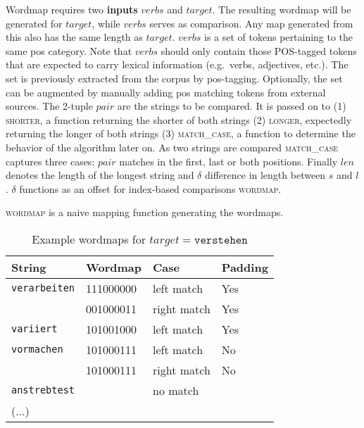 Wordmap requires two \textbf{inputs} $verbs$ and $target$.
The resulting wordmap will be generated for $target$, while $verbs$ serves as comparison.
Any map generated from this also has the same length as $target$.
$verbs$ is a set of tokens pertaining to the same \ac{pos} category.
Note that $verbs$ should only contain those POS-tagged tokens that are expected to carry lexical information (e.g.\ verbs, adjectives, etc.).
The set is previously extracted from the corpus by \ac{pos}\hyphen tagging.
Optionally, the set can be augmented by manually adding \ac{pos} matching tokens from external sources.
The 2-tuple $pair$ are the strings to be compared.
It is passed on to (1) \textsc{shorter}, a function returning the shorter of both strings (2) \textsc{longer}, expectedly returning the longer of both strings (3) \textsc{match\_case}, a function to determine the behavior of the algorithm later on.
As two strings are compared \textsc{match\_case} captures three cases: $pair$ matches in the first, last or both positions.
Finally $len$ denotes the length of the longest string and $\delta$ difference in length between $s$ and $l$.
$\delta$ functions as an offset for index-based comparisons \textsc{wordmap}.

\textsc{wordmap} is a naive mapping function generating the wordmaps.


\begin{table}
    \centering
    \begin{tabular}{llll}
        \toprule
        \textbf{String} & \textbf{Wordmap} & \textbf{Case} & \textbf{Padding} \\
        \midrule
        \texttt{verarbeiten} & 111000000 & left match & Yes \\
         & 001000011 & right match & Yes \\
        \texttt{variiert} & 101001000 & left match & Yes \\
        \texttt{vormachen} & 101000111 & left match & No \\
        & 101000111 & right match & No \\
        \texttt{anstrebtest} &  & no match &   \\
        (...) &  &  &  \\
        \bottomrule
    \end{tabular}
    \caption{Example wordmaps for $target = \texttt{verstehen}$}
    \label{tab:}
\end{table}


